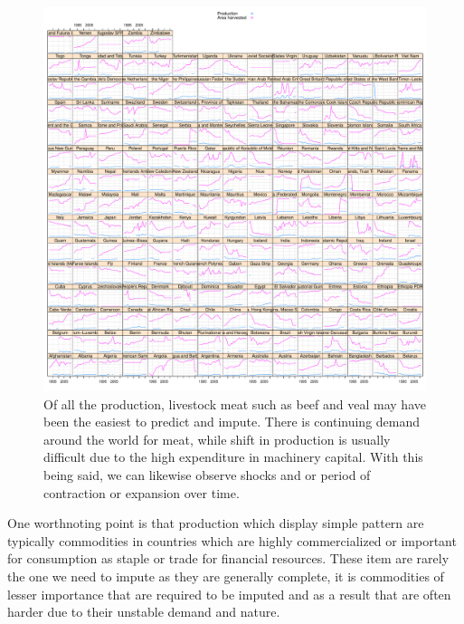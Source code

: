 \documentclass[nojss]{jss}\usepackage[]{graphicx}\usepackage[]{color}
\makeatletter
\def\maxwidth{ %
  \ifdim\Gin@nat@width>\linewidth
    \linewidth
  \else
    \Gin@nat@width
  \fi
}
\newenvironment{knitrout}{}{} %
\makeatother
\begin{document}
\begin{knitrout}
\color{fgcolor}\begin{figure}[!ht]


{\centering \includegraphics[width=\maxwidth]{figure/beef-production-area-explore} 

}

\caption[Of all the production, livestock meat such as beef and veal may have been the easiest to predict and impute]{Of all the production, livestock meat such as beef and veal may have been the easiest to predict and impute. There is continuing demand around the world for meat, while shift in production is usually difficult due to the high expenditure in machinery capital. With this being said, we can likewise observe shocks and or period of contraction or expansion over time.\label{fig:beef-production-area-explore}}
\end{figure}


\end{knitrout}


One worthnoting point is that production which display simple pattern
are typically commodities in countries which are highly commercialized
or important for consumption as staple or trade for financial
resources. These item are rarely the one we need to impute as they are
generally complete, it is commodities of lesser importance that are
required to be imputed and as a result that are often harder due to
their unstable demand and nature.\\
\end{document}

